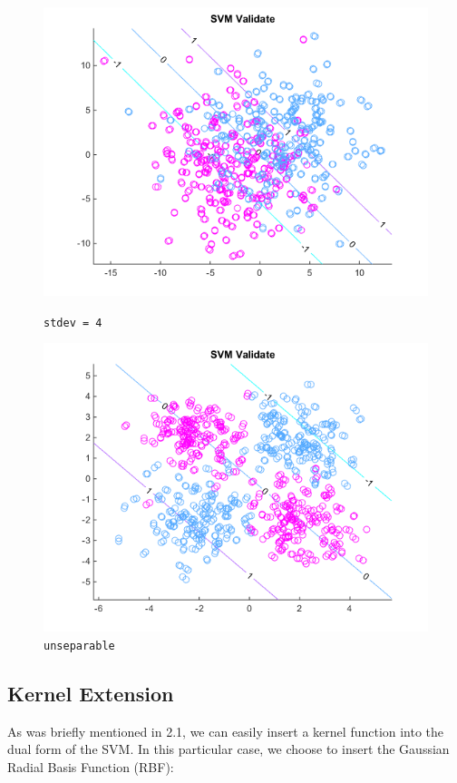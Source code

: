 \documentclass[10pt,letterpaper]{article}
\begin{document}
\begin{center}
\begin{figure}[!htb]
  \includegraphics[width=\linewidth]{figures/stdev4.png}
  \caption{\texttt{stdev = 4}}
\endminipage\hfill
{}
  \includegraphics[width=\linewidth]{figures/nonsep.png}
  \caption{\texttt{unseparable}}\label{fig:nonsep}
\endminipage
\end{figure}
\end{center}

\subsection{Kernel Extension}
As was briefly mentioned in 2.1, we can easily insert a kernel function into the dual form of the SVM. In this particular case, we choose to insert the Gaussian Radial Basis Function (RBF):
\end{document}
